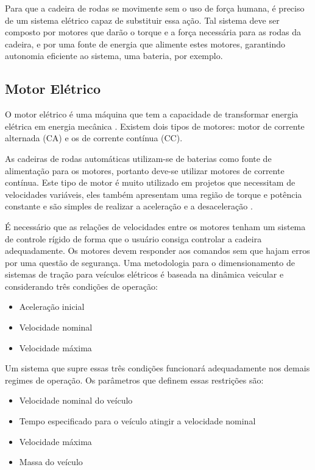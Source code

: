 Para que a cadeira de rodas se movimente sem o uso de força humana, é preciso de um sistema elétrico capaz de substituir essa ação. Tal sistema deve ser composto por motores que darão o torque e a força necessária para as rodas da cadeira, e por uma fonte de energia que alimente estes motores, garantindo autonomia eficiente ao sistema, uma bateria, por exemplo.

\subsection{Motor Elétrico}

O motor elétrico é uma máquina que tem a capacidade de transformar energia elétrica em energia mecânica \cite{projeto_cadeira_rodas_inteligente}. Existem dois tipos de motores: motor de corrente alternada (CA) e os de corrente contínua (CC).

As cadeiras de rodas automáticas utilizam-se de baterias como fonte de alimentação para os motores, portanto deve-se utilizar motores de corrente contínua. Este tipo de motor é muito utilizado em projetos que necessitam de velocidades variáveis, eles também apresentam uma região de torque e potência constante e são simples de realizar a aceleração e a desaceleração \cite{manual_bateria_unipower}.

É necessário que as relações de velocidades entre os motores tenham um sistema de controle rígido de forma que o usuário consiga controlar a cadeira adequadamente. Os motores devem responder aos comandos sem que hajam erros por uma questão de segurança. Uma metodologia para o dimensionamento de sistemas de tração para veículos elétricos é baseada na dinâmica veicular e considerando três condições de operação:

\begin{itemize}
	\item Aceleração inicial
	\item Velocidade nominal
	\item Velocidade máxima
\end{itemize}

Um sistema que supre essas três condições funcionará adequadamente nos demais regimes de operação. Os parâmetros que definem essas restrições são:

\begin{itemize}
	\item Velocidade nominal do veículo
    \item Tempo especificado para o veículo atingir a velocidade nominal
    \item Velocidade máxima
    \item Massa do veículo
\end{itemize}

